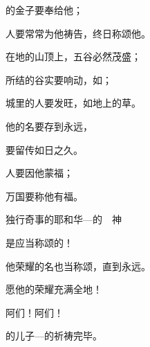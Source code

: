 {\par }{的金子要奉给他；
\par }{\Q 人要常常为他祷告，终日称颂他。
\par }{\Q {}在地的山顶上，五谷必然茂盛；
\par }{\Q 所结的谷实要响动，如{}{}；
\par }{\Q 城里的人要发旺，如地上的草。
\par }{\Q {}他的名要存到永远，
\par }{\Q 要留传如日之久。
\par }{\Q 人要因他蒙福；
\par }{\Q 万国要称他有福。
\par }{\Q {}独行奇事的耶和华—{}的　神
\par }{\Q 是应当称颂的！
\par }{\Q {}他荣耀的名也当称颂，直到永远。
\par }{\Q 愿他的荣耀充满全地！
\par }{\Q 阿们！阿们！
\par }{\BB \par }{\Q {}的儿子—{}的祈祷完毕。

}
